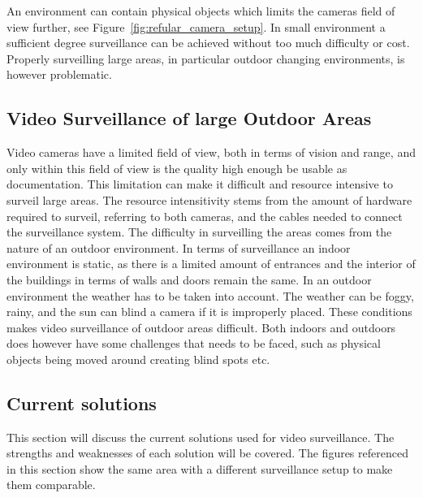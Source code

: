 An environment can contain physical objects which limits the cameras field of view further, see Figure~\ref{fig:refular_camera_setup}.
In small environment a sufficient degree surveillance can be achieved without too much difficulty or cost.
Properly surveilling large areas, in particular outdoor changing environments, is however problematic.

\subsection{Video Surveillance of large Outdoor Areas}\label{subsec:surveillance_of_large_outdoor_areas}
Video cameras have a limited field of view, both in terms of vision and range, and only within this field of view is the quality high enough be usable as documentation.
This limitation can make it difficult and resource intensive to surveil large areas.
The resource intensitivity stems from the amount of hardware required to surveil, referring to both cameras, and the cables needed to connect the surveillance system.
The difficulty in surveilling the areas comes from the nature of an outdoor environment.
In terms of surveillance an indoor environment is static, as there is a limited amount of entrances and the interior of the buildings in terms of walls and doors remain the same.
In an outdoor environment the weather has to be taken into account.
The weather can be foggy, rainy, and the sun can blind a camera if it is improperly placed.
These conditions makes video surveillance of outdoor areas difficult.
Both indoors and outdoors does however have some challenges that needs to be faced, such as physical objects being moved around creating blind spots etc.

\subsection{Current solutions}
This section will discuss the current solutions used for video surveillance.
The strengths and weaknesses of each solution will be covered.
The figures referenced in this section show the same area with a different surveillance setup to make them comparable.
